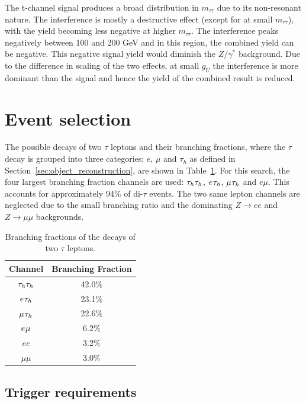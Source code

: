 The t-channel signal produces a broad distribution in $m_{\tau\tau}$ due to its non-resonant nature.
The interference is mostly a destructive effect (except for at small $m_{\tau\tau}$), with the yield becoming less negative at higher $m_{\tau\tau}$.
The interference peaks negatively between 100 and 200 GeV and in this region, the combined yield can be negative.
This negative signal yield would diminish the $Z/\gamma^{*}$ background.
Due to the difference in scaling of the two effects, at small $g_{U}$ the interference is more dominant than the signal and hence the yield of the combined result is reduced.

\section{Event selection}

The possible decays of two $\tau$ leptons and their branching fractions, where the $\tau$ decay is grouped into three categories; $e$, $\mu$ and $\tau_h$ as defined in Section~\ref{sec:object_reconstruction}, are shown in Table~\ref{tab:ditau_br}. 
For this search, the four largest branching fraction channels are used: $\tau_{h}\tau_{h}$, $e_{}\tau_{h}$, $\mu_{}\tau_{h}$ and $e\mu$.
This accounts for approximately 94\% of di-$\tau$ events.
The two same lepton channels are neglected due to the small branching ratio and the dominating $Z\rightarrow ee$ and $Z\rightarrow \mu\mu$ backgrounds. \\

\begin{table}[!hbtp]
    \centering
    \begin{tabular}{|c|c|}
         \hline
         Channel & Branching Fraction  \\
         \hline
         \hline
         $\tau_{h}\tau_{h}$ & 42.0\% \\
         $e_{}\tau_{h}$ & 23.1\% \\
         $\mu_{}\tau_{h}$ & 22.6\% \\
         $e_{}\mu_{}$ & 6.2\% \\
         $e e$ & 3.2\% \\
         $\mu \mu$ & 3.0\% \\
         \hline
    \end{tabular}
    \caption{Branching fractions of the decays of two $\tau$ leptons.}
    \label{tab:ditau_br}
\end{table}

\subsection{Trigger requirements}
\label{sec:trig_ditau}

